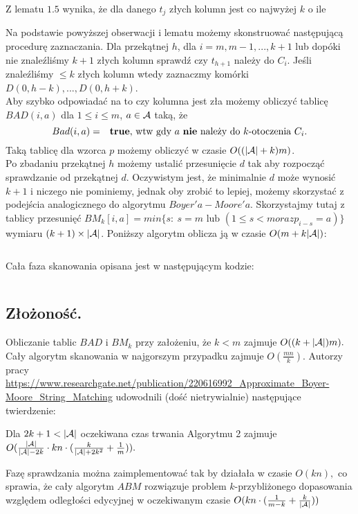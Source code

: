 \begin{remark-thm}
    Z lematu $1.5$ wynika, że dla danego $t_j$ złych kolumn jest co najwyżej $k$ o ile 
\end{remark-thm}

Na podstawie powyższej obserwacji i lematu możemy skonstruować następującą procedurę zaznaczania. Dla przekątnej $h$, dla $i=m, m-1, ..., k+1$ lub dopóki nie znaleźliśmy $k+1$ złych kolumn sprawdź czy $t_{h+1}$ należy do $C_i$. 
Jeśli znaleźliśmy $\leq k$ złych kolumn wtedy zaznaczmy komórki $D(0, h-k),...,D(0,h+k)$.\\
Aby szybko odpowiadać na to czy kolumna jest zła możemy obliczyć tablicę $BAD(i,a)$ dla $1 \leq i \leq m$, $a \in \mathcal{A}$ taką, że
\[
    Bad(i,a) = \text{ \textbf{ true}, wtw  gdy $a$ \textbf{nie} należy do $k$-otoczenia $C_i$.}
\]
Taką tablicę dla wzorca $p$ możemy obliczyć w czasie $O((|\mathcal{A}|+k)m)$.\\
Po zbadaniu przekątnej $h$ możemy ustalić przesunięcie $d$ tak aby rozpocząć sprawdzanie od przekątnej $d$. Oczywistym jest, że minimalnie $d$ może wynosić $k+1$ i niczego nie pominiemy, jednak oby zrobić to lepiej, możemy skorzystać z podejścia analogicznego do algorytmu $Boyer'a-Moore'a$. Skorzystajmy tutaj z tablicy przesunięć $BM_k[i,a] = min \{s:\ s=m \text{ lub } (1\leq s < m oraz p_{i-s} = a)\}$ wymiaru $(k+1) \times |\mathcal{A}|$. Poniższy algorytm oblicza ją w czasie $O(m+k|\mathcal{A}|)$:

\begin{code}
\inputminted{python}{bm_multidim.py}
\label{alg:exact-string-matching-morris-pratt}
\end{code}

Cała faza skanowania opisana jest w następującym kodzie:

\begin{code}
\inputminted{python}{scan_faze.py}
\label{alg:exact-string-matching-morris-pratt}
\end{code}

\subsection{Złożoność.}

Obliczanie tablic $BAD$ i $BM_k$ przy założeniu, że $k < m$ zajmuje $O((k+|\mathcal{A}|)m).$ Cały algorytm skanowania w najgorszym przypadku zajmuje $O(\frac{mn}{k}).$ Autorzy pracy \url{https://www.researchgate.net/publication/220616992_Approximate_Boyer-Moore_String_Matching} udowodnili (dość nietrywialnie) następujące twierdzenie:

\begin{theorem}{}{}
    Dla $2k+1 < |\mathcal{A}|$ oczekiwana czas trwania Algorytmu 2 zajmuje $O(\frac{|\mathcal{A}|}{|\mathcal{A}| - 2k} \cdot kn \cdot (\frac{k}{|\mathcal{A}| + 2k^2} + \frac{1}{m})).$
\end{theorem}

Fazę sprawdzania można zaimplementować tak by działała w czasie $O(kn),$ co sprawia, że cały algorytm $ABM$ rozwiązuje problem $k$-przybliżonego dopasowania względem odległości edycyjnej w oczekiwanym czasie $O(kn\cdot(\frac{1}{m-k} + \frac{k}{|\mathcal{A}|}))$
